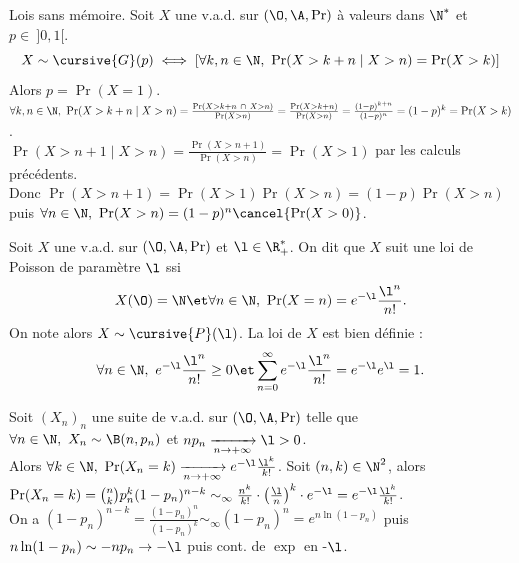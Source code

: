 \documentclass[11pt]{article}
\begin{document}
\vspace*{-0.8cm}

\begin{prop}{Lois sans mémoire.}{}
    Soit $X$ une v.a.d. sur $(\O,\A,\Pr)$ à valeurs dans $\N^*$ et $p\in~]0,1[$.
    \begin{equation*}
        X \sim \cursive{G}(p) \iff \left[ \forall k,n \in \N, ~ \Pr(X>k+n \mid X>n) = \Pr(X>k)\right]
    \end{equation*}
    Alors $p=\Pr(X=1)$.
    \tcblower
    \boxed{\ra} $\forall k,n \in \N, ~ \Pr(X>k+n\mid X>n) = \frac{\Pr(X>k+n ~ \cap ~ X > n)}{\Pr(X>n)}=\frac{\Pr(X > k + n)}{\Pr(X > n)} = \frac{(1-p)^{k+n}}{(1-p)^n}=(1-p)^k=\Pr(X>k)$.\\
    \boxed{\la} $\Pr(X>n+1\mid X>n)=\frac{\Pr(X>n+1)}{\Pr(X>n)}=\Pr(X>1)$ par les calculs précédents.\\
    Donc $\Pr(X>n+1)=\Pr(X>1)\Pr(X>n)=(1-p)\Pr(X>n)$ puis $\forall n \in \N, ~ \Pr(X>n)=(1-p)^n\cancel{\Pr(X>0)}$.
\end{prop}

\vspace*{-0.8cm}

\begin{defi}{}{}
    Soit $X$ une v.a.d. sur $(\O,\A,\Pr)$ et $\l\in \R_+^*$. On dit que $X$ suit une loi de Poisson de paramètre $\l$ ssi\\[-0.3cm]
    \begin{equation*}
        X(\O) = \N \et \forall n \in \N, ~ \Pr(X=n) = e^{-\l}\frac{\l^n}{n!}.
    \end{equation*}
    On note alors $X\sim\cursive{P}(\l)$.
    \tcblower
    La loi de $X$ est bien définie :
    \begin{equation*}
        \forall n \in \N, ~ e^{-\l}\frac{\l^n}{n!} \geq 0 \et \sum_{n=0}^\infty e^{-\l}\frac{\l^n}{n!}=e^{-\l}e^\l = 1.
    \end{equation*}
\end{defi}

\begin{prop}{}{}
    Soit $(X_n)_n$ une suite de v.a.d. sur $(\O,\A,\Pr)$ telle que $\forall n \in \N, ~ X_n \sim \B(n,p_n)$ et $np_n \xrightarrow[n\to+\infty]{}\l>0$.\\
    Alors $\forall k \in \N, ~ \Pr(X_n = k) \xrightarrow[n\to+\infty]{}e^{-\l}\frac{\l^k}{k!}$.
    \tcblower
    Soit $(n,k)\in\N^2$, alors $\Pr(X_n=k)=\binom{n}{k}p_n^k(1-p_n)^{n-k}\sim_{\infty} \frac{n^k}{k!}\cdot\left( \frac{\l}{n} \right)^k\cdot e^{-\l} = e^{-\l}\frac{\l^k}{k!}$.\\
    On a $(1-p_n)^{n-k}=\frac{(1-p_n)^n}{(1-p_n)^k}\sim_\infty(1-p_n)^n=e^{n\ln(1-p_n)}$ puis $n\ln(1-p_n)\sim-np_n\to-\l$ puis cont. de $\exp$ en -$\l$.
\end{prop}
\end{document}
